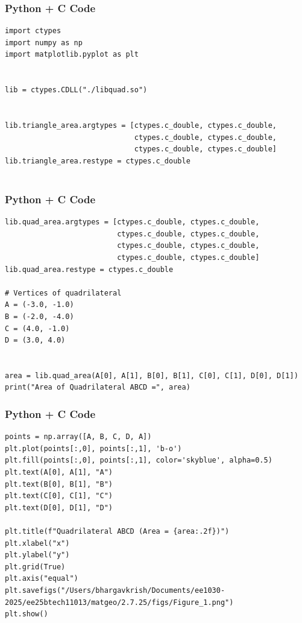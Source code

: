 \documentclass{beamer}
\begin{document}
\begin{frame}[fragile]
    \frametitle{Python + C Code}
    \begin{lstlisting}
import ctypes
import numpy as np
import matplotlib.pyplot as plt


lib = ctypes.CDLL("./libquad.so")


lib.triangle_area.argtypes = [ctypes.c_double, ctypes.c_double,
                              ctypes.c_double, ctypes.c_double,
                              ctypes.c_double, ctypes.c_double]
lib.triangle_area.restype = ctypes.c_double


    \end{lstlisting}
\end{frame}

\begin{frame}[fragile]
    \frametitle{Python + C Code}
    \begin{lstlisting}
lib.quad_area.argtypes = [ctypes.c_double, ctypes.c_double,
                          ctypes.c_double, ctypes.c_double,
                          ctypes.c_double, ctypes.c_double,
                          ctypes.c_double, ctypes.c_double]
lib.quad_area.restype = ctypes.c_double

# Vertices of quadrilateral
A = (-3.0, -1.0)
B = (-2.0, -4.0)
C = (4.0, -1.0)
D = (3.0, 4.0)


area = lib.quad_area(A[0], A[1], B[0], B[1], C[0], C[1], D[0], D[1])
print("Area of Quadrilateral ABCD =", area)

    \end{lstlisting}
\end{frame}

\begin{frame}[fragile]
    \frametitle{Python + C Code}
    \begin{lstlisting}
points = np.array([A, B, C, D, A])  
plt.plot(points[:,0], points[:,1], 'b-o')
plt.fill(points[:,0], points[:,1], color='skyblue', alpha=0.5)
plt.text(A[0], A[1], "A")
plt.text(B[0], B[1], "B")
plt.text(C[0], C[1], "C")
plt.text(D[0], D[1], "D")

plt.title(f"Quadrilateral ABCD (Area = {area:.2f})")
plt.xlabel("x")
plt.ylabel("y")
plt.grid(True)
plt.axis("equal")
plt.savefigs("/Users/bhargavkrish/Documents/ee1030-2025/ee25btech11013/matgeo/2.7.25/figs/Figure_1.png")
plt.show()

    \end{lstlisting}
\end{frame}
\end{document}
